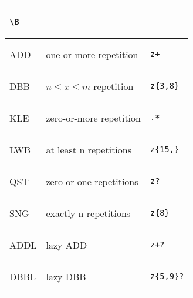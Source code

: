 \begin{xtabular}{lll}
\begin{minipage}{0.5in}
\begin{verbatim}
\B
\end{verbatim}\end{minipage} \\
\midrule
ADD & one-or-more repetition &
\begin{minipage}{0.5in}\begin{verbatim}
z+
\end{verbatim}\end{minipage} \\
\midrule
DBB & $n\le x \le m$ repetition &
\begin{minipage}{0.5in}\begin{verbatim}
z{3,8}
\end{verbatim}\end{minipage} \\
\midrule
KLE & zero-or-more repetition &
\begin{minipage}{0.5in}\begin{verbatim}
.*
\end{verbatim}\end{minipage} \\
\midrule
LWB & at least n repetitions &
\begin{minipage}{0.5in}\begin{verbatim}
z{15,}
\end{verbatim}\end{minipage} \\
\midrule
QST & zero-or-one repetitions &
\begin{minipage}{0.5in}\begin{verbatim}
z?
\end{verbatim}\end{minipage} \\
\midrule
SNG & exactly n repetitions &
\begin{minipage}{0.5in}\begin{verbatim}
z{8}
\end{verbatim}\end{minipage} \\
\midrule
ADDL & lazy ADD &
\begin{minipage}{0.5in}\begin{verbatim}
z+?
\end{verbatim}\end{minipage} \\
\midrule
DBBL & lazy DBB &
\begin{minipage}{0.5in}\begin{verbatim}
z{5,9}?
\end{verbatim}\end{minipage} \\

\end{xtabular}
